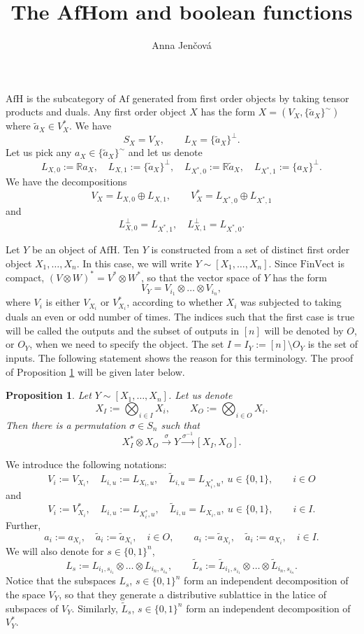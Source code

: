\documentclass[12pt]{article}
\title{The AfHom and boolean functions}
\author{Anna Jen\v cov\'a}
\newtheorem{prop}{Proposition}
\theoremstyle{definition}
\theoremstyle{remark}
\def \Afh{\mathrm{AfH}}
\def \Af{\mathrm{Af}}
\def \FV{\mathrm{FinVect}}
\begin{document}
\maketitle

$\Afh$ is the subcategory of $\Af$ generated from first order objects by taking tensor
products and duals. Any first order object $X$ has the form $X=(V_X,\{\tilde a_X\}^\sim)$ where
$\tilde a_X\in V_X^*$. We have
\[
S_X=V_X,\qquad L_X=\{\tilde a_X\}^\perp.
\]
Let us pick any $a_X\in \{\tilde a_X\}^\sim$ and let us denote
\[
L_{X,0}:=\mathbb Ra_X,\quad L_{X,1}:=\{\tilde a_X\}^\perp,\quad L_{X^*,0}:=\mathbb R\tilde
a_X,\quad L_{X^*,1}:=\{a_X\}^\perp.
\]
We have the decompositions
\begin{equation}\label{eq:Ldecomp}
V_X=L_{X,0}\oplus L_{X,1},\qquad V_X^*= L_{X^*,0}\oplus L_{X^*,1}
\end{equation}
and 
\begin{equation}\label{eq:Lperp}
L_{X,0}^\perp=L_{X^*,1},\quad L_{X,1}^\perp=L_{X^*,0}.
\end{equation}

Let  $Y$ be an object of  $\Afh$. Ten $Y$ is constructed from a set of distinct first order object $X_1,\dots, X_n$.
In this case, we will write $Y\sim[X_1,\dots,X_n]$.  Since
$\FV$ is compact, 
$(V\otimes W)^*=V^*\otimes W^*$, so that the vector space of $Y$ has the form
\[
V_Y=V_{i_1}\otimes \dots\otimes V_{i_n},
\]
where $V_i$ is either $V_{X_i}$ or $V_{X_i}^*$, according to whether $X_i$ was subjected
to taking duals an even or odd number of times. The indices such that the first
case is true will be called the outputs and the subset of outputs in $[n]$ will be denoted
by $O$, or $O_Y$, when we need to specify the object. The set $I=I_Y:=[n]\setminus O_Y$ is
the set of inputs. The following statement shows the reason for this terminology.
The proof of Proposition \ref{prop:setting} will be given later below.

\begin{prop}\label{prop:setting} Let $Y\sim[X_1,\dots,
X_n]$. Let us denote  
\[
X_I:=\bigotimes_{i\in I} X_i,\qquad X_O:=\bigotimes_{i\in O} X_i.
\]
Then there is a permutation $\sigma\in S_n$ such that 
\[
X_I^*\otimes X_O\xrightarrow{\sigma} Y \xrightarrow{\sigma^{-1}} [X_I,X_O].
\]
\end{prop}


We introduce the following notations:
\[
V_i:=V_{X_i},\quad L_{i,u}:=L_{X_i,u},\quad \tilde L_{i,u}=L_{X^*_i,u},\ u\in \{0,1\}, \qquad i\in O
\]
and 
\[
V_i:=V_{X_i}^*,\quad L_{i,u}:=L_{X^*_i,u},\quad \tilde L_{i,u}=L_{X_i,u},\ u\in \{0,1\},\qquad i\in I.
\]
Further,
\[
a_i:=a_{X_i},\quad \tilde a_i:=\tilde a_{X_i},\quad i\in O,\qquad a_i:=
\tilde a_{X_i},\quad \tilde a_i:=a_{X_i},\quad i\in I.
\]
We will also denote for $s\in \{0,1\}^n$,
\[
L_s:=L_{i_1,s_{i_1}}\otimes\dots\otimes  L_{i_n,s_{i_n}},\qquad \tilde L_s:=\tilde
L_{i_1,s_{i_1}}\otimes\dots\otimes  \tilde L_{i_n,s_{i_n}}.
\]
Notice that the subspaces  $L_s$, $s\in\{0,1\}^n$ form an independent decomposition of the space
$V_Y$, so that they generate a distributive sublattice in the latice of subspaces of
$V_Y$. Similarly, $\tilde L_s$, $s\in \{0,1\}^n$ form an independent decomposition of
$V_Y^*$. 
\end{document}
